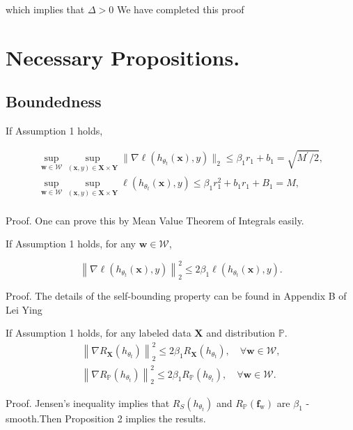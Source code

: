 which implies that $\Delta>0$ We have completed this proof

\section{Necessary Propositions.}
\subsection{Boundedness}
\begin{proposition}\label{proposition-1}
If Assumption 1 holds,

$$\begin{gathered}
\operatorname*{sup}_{\mathbf{w}\in\mathcal{W}}\operatorname*{sup}_{(\mathbf{x},y)\in\boldsymbol{X}\times\boldsymbol{Y}}\|\nabla\ell(h_{\theta_t}(\mathbf{x}),y)\|_{2}\leq\beta_{1}r_{1}+b_{1}={\sqrt{M^{\prime}/2}}, \\
\sup_{\mathbf{w}\in\mathcal{W}}\sup_{(\mathbf{x},y)\in\boldsymbol{X}\times\boldsymbol{Y}}\ell(h_{\theta_t}(\mathbf{x}),y)\leq\beta_{1}r_{1}^{2}+b_{1}r_{1}+B_{1}=M, \\
\end{gathered}$$

Proof. One can prove this by Mean Value Theorem of Integrals easily.
\end{proposition}
\begin{proposition}\label{proposition-2}
 If Assumption 1 holds, for any $\mathbf{w}\in\mathcal{W}$,

$$\left\|\nabla\ell(h_{\theta_t}(\mathbf{x}),y)\right\|_2^2\leq2\beta_1\ell(h_{\theta_t}(\mathbf{x}),y).$$

Proof. The details of the self-bounding property can be found in Appendix B of Lei Ying
\end{proposition}

\begin{proposition}\label{proposition-3}
If Assumption 1 holds, for any labeled data $\boldsymbol{X}$ and distribution $\mathbb{P}$.
\begin{gather}
\left\|\nabla R_{\boldsymbol{X}}(h_{\theta_t})\right\|_{2}^{2}\leq2\beta_{1}R_{\boldsymbol{X}}(h_{\theta_t}),\quad\forall\mathbf{w}\in\mathcal{W},\\
\left\|\nabla R_{\mathbb{P}}(h_{\theta_t})\right\|_{2}^{2}\leq2\beta_{1}R_{\mathbb{P}}(h_{\theta_t}),\quad\forall\mathbf{w}\in\mathcal{W}.
\end{gather}

Proof. Jensen's inequality implies that $R_{S}(h_{\theta_t})$ and $R_{\mathbb{P}}(\mathbf{f}_{\mathrm{w}})$ are $\beta_{1}$ -smooth.Then Proposition 2 implies the results.
\end{proposition}

